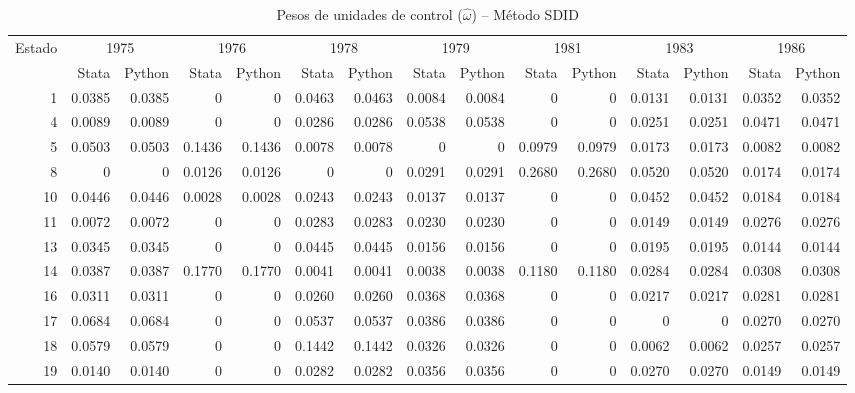 \begin{table}[H]
\centering
\caption{Pesos de unidades de control ($\hat{\omega}$) -- M\'etodo SDID}
\label{tab:omega_sdid}
\footnotesize
\begin{tabular}{rrrrrrrrrrrrrrr}
\toprule
Estado & \multicolumn{2}{c}{1975} & \multicolumn{2}{c}{1976} & \multicolumn{2}{c}{1978} & \multicolumn{2}{c}{1979} & \multicolumn{2}{c}{1981} & \multicolumn{2}{c}{1983} & \multicolumn{2}{c}{1986} \\
 & \scriptsize Stata & \scriptsize Python & \scriptsize Stata & \scriptsize Python & \scriptsize Stata & \scriptsize Python & \scriptsize Stata & \scriptsize Python & \scriptsize Stata & \scriptsize Python & \scriptsize Stata & \scriptsize Python & \scriptsize Stata & \scriptsize Python \\
\midrule
1 & 0.0385 & 0.0385 & 0 & 0 & 0.0463 & 0.0463 & 0.0084 & 0.0084 & 0 & 0 & 0.0131 & 0.0131 & 0.0352 & 0.0352 \\
4 & 0.0089 & 0.0089 & 0 & 0 & 0.0286 & 0.0286 & 0.0538 & 0.0538 & 0 & 0 & 0.0251 & 0.0251 & 0.0471 & 0.0471 \\
5 & 0.0503 & 0.0503 & 0.1436 & 0.1436 & 0.0078 & 0.0078 & 0 & 0 & 0.0979 & 0.0979 & 0.0173 & 0.0173 & 0.0082 & 0.0082 \\
8 & 0 & 0 & 0.0126 & 0.0126 & 0 & 0 & 0.0291 & 0.0291 & 0.2680 & 0.2680 & 0.0520 & 0.0520 & 0.0174 & 0.0174 \\
10 & 0.0446 & 0.0446 & 0.0028 & 0.0028 & 0.0243 & 0.0243 & 0.0137 & 0.0137 & 0 & 0 & 0.0452 & 0.0452 & 0.0184 & 0.0184 \\
11 & 0.0072 & 0.0072 & 0 & 0 & 0.0283 & 0.0283 & 0.0230 & 0.0230 & 0 & 0 & 0.0149 & 0.0149 & 0.0276 & 0.0276 \\
13 & 0.0345 & 0.0345 & 0 & 0 & 0.0445 & 0.0445 & 0.0156 & 0.0156 & 0 & 0 & 0.0195 & 0.0195 & 0.0144 & 0.0144 \\
14 & 0.0387 & 0.0387 & 0.1770 & 0.1770 & 0.0041 & 0.0041 & 0.0038 & 0.0038 & 0.1180 & 0.1180 & 0.0284 & 0.0284 & 0.0308 & 0.0308 \\
16 & 0.0311 & 0.0311 & 0 & 0 & 0.0260 & 0.0260 & 0.0368 & 0.0368 & 0 & 0 & 0.0217 & 0.0217 & 0.0281 & 0.0281 \\
17 & 0.0684 & 0.0684 & 0 & 0 & 0.0537 & 0.0537 & 0.0386 & 0.0386 & 0 & 0 & 0 & 0 & 0.0270 & 0.0270 \\
18 & 0.0579 & 0.0579 & 0 & 0 & 0.1442 & 0.1442 & 0.0326 & 0.0326 & 0 & 0 & 0.0062 & 0.0062 & 0.0257 & 0.0257 \\
19 & 0.0140 & 0.0140 & 0 & 0 & 0.0282 & 0.0282 & 0.0356 & 0.0356 & 0 & 0 & 0.0270 & 0.0270 & 0.0149 & 0.0149 \\

\end{tabular}
\end{table}
